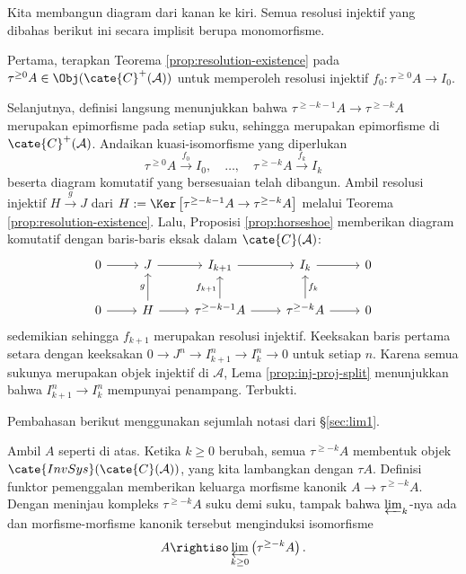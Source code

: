\begin{bukti}
	Kita membangun diagram dari kanan ke kiri. Semua resolusi injektif yang
	dibahas berikut ini secara implisit berupa monomorfisme.

	Pertama, terapkan Teorema \ref{prop:resolution-existence} pada
	$\tau^{\geq0}A\in\Obj(\cate{C}^+(\mathcal{A}))$ untuk memperoleh
	resolusi injektif $f_0:\tau^{\geq0}A\to I_0$.

	Selanjutnya, definisi langsung menunjukkan bahwa
	$\tau^{\geq-k-1}A\to\tau^{\geq-k}A$ merupakan epimorfisme pada setiap
	suku, sehingga merupakan epimorfisme di
	$\cate{C}^+(\mathcal{A})$. Andaikan kuasi-isomorfisme yang diperlukan
	\[
	\tau^{\geq0}A\xrightarrow{f_0}I_0,\quad\ldots,\quad
	\tau^{\geq-k}A\xrightarrow{f_k}I_k
	\]
	beserta diagram komutatif yang bersesuaian telah dibangun. Ambil resolusi
	injektif $H\xrightarrow{g}J$ dari
	$H:=\Ker\left[\tau^{\geq-k-1}A\to\tau^{\geq-k}A\right]$ melalui
	Teorema \ref{prop:resolution-existence}. Lalu, Proposisi
	\ref{prop:horseshoe} memberikan diagram komutatif dengan baris-baris eksak
	dalam $\cate{C}(\mathcal{A})$:
	\[\begin{tikzcd}
		0 \arrow[r] & J \arrow[r] & I_{k+1} \arrow[r] & I_k \arrow[r] & 0 \\
		0 \arrow[r] & H \arrow[r] \arrow[u, "g"] &
		\tau^{\geq-k-1}A \arrow[u, "{f_{k+1}}"] \arrow[r] &
		\tau^{\geq-k}A \arrow[r] \arrow[u, "f_k"'] & 0
	\end{tikzcd}\]
	sedemikian sehingga $f_{k+1}$ merupakan resolusi injektif. Keeksakan
	baris pertama setara dengan keeksakan
	$0\to J^n\to I_{k+1}^n\to I_k^n\to0$ untuk setiap $n$. Karena semua
	sukunya merupakan objek injektif di $\mathcal{A}$, Lema
	\ref{prop:inj-proj-split} menunjukkan bahwa
	$I_{k+1}^n\to I_k^n$ mempunyai penampang. Terbukti.
\end{bukti}

Pembahasan berikut menggunakan sejumlah notasi dari \S\ref{sec:lim1}.

Ambil $A$ seperti di atas. Ketika $k\geq0$ berubah, semua
$\tau^{\geq-k}A$ membentuk objek $\cate{InvSys}(\cate{C}(\mathcal{A}))$,
yang kita lambangkan dengan $\tau A$. Definisi funktor pemenggalan memberikan
keluarga morfisme kanonik $A\to\tau^{\geq-k}A$. Dengan meninjau kompleks
$\tau^{\geq-k}A$ suku demi suku, tampak bahwa $\varprojlim_k$-nya ada dan
morfisme-morfisme kanonik tersebut menginduksi isomorfisme
\begin{equation}\label{eqn:A-lim-truncation}
	A \rightiso \varprojlim_{k \geq 0} \left( \tau^{\geq -k} A \right).
\end{equation}

